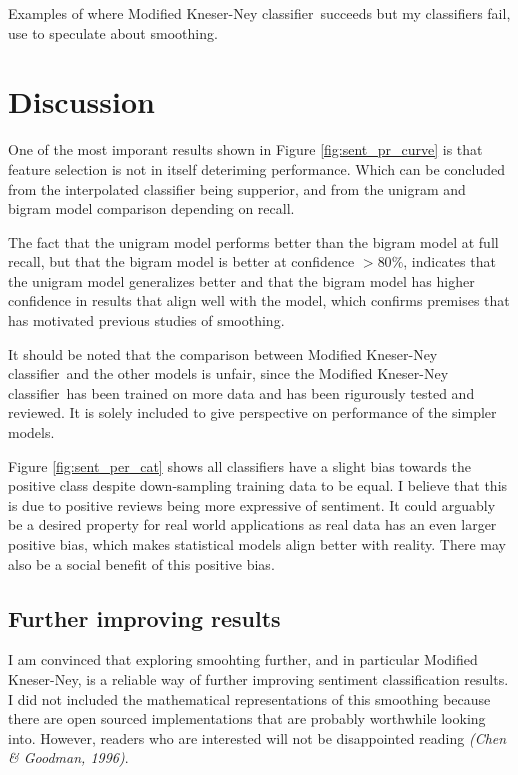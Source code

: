 \documentclass[a4paper,11pt]{kth-mag}
\newcommand{\ysc}{Modified Kneser-Ney classifier}
\begin{document}
Examples of where \ysc~succeeds but my classifiers fail, use to speculate about smoothing.


\newpage
\section{Discussion}

One of the most imporant results shown in Figure \ref{fig:sent_pr_curve}
is that feature selection is not in itself deteriming performance.
Which can be concluded from the interpolated classifier being supperior,
and from the unigram and bigram model comparison depending on recall.

The fact that the unigram model performs better than the bigram model at full recall,
but that the bigram model is better at confidence $>80\%$,
indicates that the unigram model generalizes better and
that the bigram model has higher confidence in results that align well with the model,
which confirms premises that has motivated previous studies of smoothing.

It should be noted that the comparison between \ysc~and the other models is unfair, since the \ysc~has been trained on more data and has been rigurously tested and reviewed. It is solely included to give perspective on performance of the simpler models.

Figure \ref{fig:sent_per_cat} shows all classifiers have a slight bias towards the positive class despite down-sampling training data to be equal. I believe that this is due to positive reviews being more expressive of sentiment. It could arguably be a desired property for real world applications as real data has an even larger positive bias, which makes statistical models align better with reality. There may also be a social benefit of this positive bias.


\subsection{Further improving results}
I am convinced that exploring smoohting further, and in particular Modified Kneser-Ney,
is a reliable way of further improving sentiment classification results. I did not included the
mathematical representations of this smoothing because there are open sourced implementations
that are probably worthwhile looking into. However, readers who are interested will not
be disappointed reading \emph{(Chen \& Goodman, 1996)}.
\end{document}
